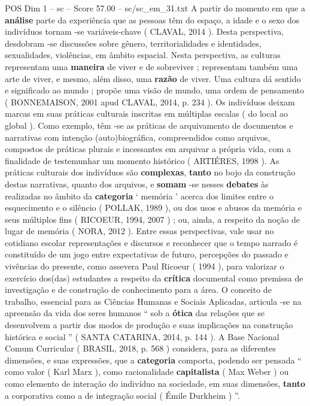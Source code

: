 \begin{textsample}{POS Dim 1 – sc – Score 57.00 – sc/sc\_em\_31.txt}
A partir do momento em que a \textbf{análise} parte da experiência que as pessoas têm do espaço, a idade e o sexo dos indivíduos tornam -se variáveis-chave ( CLAVAL, 2014 ).
Desta perspectiva, desdobram -se discussões sobre gênero, territorialidades e identidades, sexualidades, violências, em âmbito espacial.
Nesta perspectiva, as culturas representam uma \textbf{maneira} de viver e de sobreviver ; representam também uma arte de viver, e mesmo, além disso, uma \textbf{razão} de viver.
Uma cultura dá sentido e significado ao mundo ; propõe uma visão de mundo, uma ordem de pensamento ( BONNEMAISON, 2001 apud CLAVAL, 2014, p. 234 ).
Os indivíduos deixam marcas em suas práticas culturais inscritas em múltiplas escalas ( do local ao global ).
Como exemplo, têm -se as práticas de arquivamento de documentos e narrativas com intenção (auto)biográfica, compreendidos como arquivos, compostos de práticas plurais e incessantes em arquivar a própria vida, com a finalidade de testemunhar um momento histórico ( ARTIÉRES, 1998 ).
As práticas culturais dos indivíduos são \textbf{complexas}, \textbf{tanto} no bojo da construção destas narrativas, quanto dos arquivos, e \textbf{somam} -se nesses \textbf{debates} às realizadas no âmbito da \textbf{categoria} ‘ memória ’ acerca dos limites entre o esquecimento e o silêncio ( POLLAK, 1989 ), ou dos usos e abusos da memória e seus múltiplos fins ( RICOEUR, 1994, 2007 ) ; ou, ainda, a respeito da noção de lugar de memória ( NORA, 2012 ).
Entre essas perspectivas, vale usar no cotidiano escolar representações e discursos e reconhecer que o tempo narrado é constituído de um jogo entre expectativas de futuro, percepções do passado e vivências do presente, como assevera Paul Ricoeur ( 1994 ), para valorizar o exercício dos(das) estudantes a respeito da \textbf{crítica} documental como premissa de investigação e de construção de conhecimento para a área.
O conceito de trabalho, essencial para as Ciências Humanas e Sociais Aplicadas, articula -se na apreensão da vida dos seres humanos “ sob a \textbf{ótica} das relações que se desenvolvem a partir dos modos de produção e suas implicações na construção histórica e social ” ( SANTA CATARINA, 2014, p. 144 ).
A Base Nacional Comum Curricular ( BRASIL, 2018, p. 568 ) considera, para as diferentes dimensões, e suas expressões, que a \textbf{categoria} comporta, podendo ser pensada “ como valor ( Karl Marx ), como racionalidade \textbf{capitalista} ( Max Weber ) ou como elemento de interação do indivíduo na sociedade, em suas dimensões, \textbf{tanto} a corporativa como a de integração social ( Émile Durkheim ) ”.

\end{textsample}
